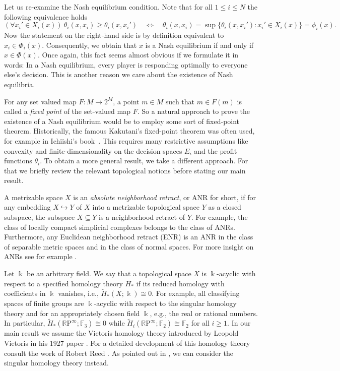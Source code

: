 \documentclass[a4paper,11pt,reqno,english]{amsart}
\theoremstyle{definition}
\newcommand\R{\mathbb R}
\begin{document}
Let us re-examine the Nash equilibrium condition. Note that for all $1\leq i \leq N$ the following equivalence holds
\begin{displaymath}
	(\forall x_i'\in X_i(x)) \ \theta_i(x,x_i) \geq \theta_i(x,x_i') \quad \Longleftrightarrow \quad \theta_i(x,x_i) = \sup\{\theta_i(x,x_i')\colon x_i'\in X_i(x) \} = \phi_i(x).
\end{displaymath}
Now the statement on the right-hand side is by definition equivalent to $x_i\in\Phi_i(x)$. Consequently, we obtain that $x$ is a Nash equilibrium if and only if $x\in\Phi(x)$. Once again, this fact seems almost obvious if we formulate it in words: In a Nash equilibrium, every player is responding optimally to everyone else's decision. This is another reason we care about the existence of Nash equilibria.

\medskip
For any set valued map $F\colon M\longrightarrow 2^{M}$, a point $m\in M$ such that $m\in F(m)$ is called a \textit{fixed point} of the set-valued map $F$.
So a natural approach to prove the existence of a Nash equilibrium would be to employ some sort of fixed-point theorem.
Historically, the famous Kakutani's fixed-point theorem was often used, for example in Ichiishi's book~\cite[Thm. 4.3.1]{Ichiishi_1983}.
This requires many restrictive assumptions like convexity and finite-dimensionality on the decision spaces $E_i$ and the profit functions $\theta_i$.
To obtain a more general result, we take a different approach.
For that we briefly review the relevant topological notions before stating our main result.

A metrizable space $X$ is an \textit{absolute neighborhood retract}, or ANR for short, if for any embedding $X\hookrightarrow Y$ of $X$ into a metrizable topological space $Y$ as a closed subspace, the subspace $X\subseteq Y$ is a neighborhood retract of $Y$.
For example, the class of locally compact simplicial complexes belongs to the class of ANRs.
Furthermore, any Euclidean neighborhood retract (ENR) is an ANR in the class of separable metric spaces and in the class of normal spaces.
For more insight on ANRs see for example \cite{Sze-tsen1965, Borsuk1967, Masrdesic1999}.

Let $\Bbbk$ be an arbitrary field. We say that a topological space $X$ is $\Bbbk$-acyclic with respect to a specified homology theory $H_{*}$ if its reduced homology with coefficients in $\Bbbk$ vanishes, i.e., $\widetilde{H}_{*}(X;\Bbbk) \cong 0$.
For example, all classifying spaces of finite groups are $\Bbbk$-acyclic with respect to the singular homology theory and for an appropriately chosen field $\Bbbk$, e.g., the real or rational numbers.
In particular, $\widetilde{H}_*(\R\mathrm{P}^{\infty};\mathbb{F}_3)\cong 0$ while $\widetilde{H}_i(\R\mathrm{P}^{\infty};\mathbb{F}_2)\cong \mathbb{F}_2$ for all $i\geq 1$.
In our main result we assume the Vietoris homology theory introduced by Leopold Vietoris in his 1927 paper \cite{Vietoris1927}.
For a detailed development of this homology theory consult the work of Robert Reed \cite{Reed1980}.
As pointed out in \cite[Prop.\,2.2]{Tesfatsion1983}, we can consider the singular homology theory instead.
\end{document}
